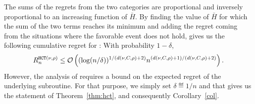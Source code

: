 The sums of the regrets from the two categories are proportional
and inversely proportional to an increasing function of $\bar H$.
By finding the value of $\bar H$ for which the sum of the two
terms reaches its minimum and adding the regret coming
from the situations where the favorable event does not hold,
gives us the following cumulative regret for \HCT: With probability $1-\delta$,
\[
	R_n^{\texttt{HCT}(\nu,\rho)} \leq \mathcal{O}\left( (\operatorname{log}(n/\delta))^{1/(d(\nu,C,\rho)+2)}n^{(d(\nu,C,\rho)+1)/(d(\nu,C,\rho)+2)} \right).
\]
However, the analysis of \POO requires a bound on the expected regret of the underlying subroutine. For that purpose, we simply set $\delta \eqdef 1/n$ and that gives us the statement of Theorem~\ref{thm:hct}, and consequently Corollary~\ref{col}.
